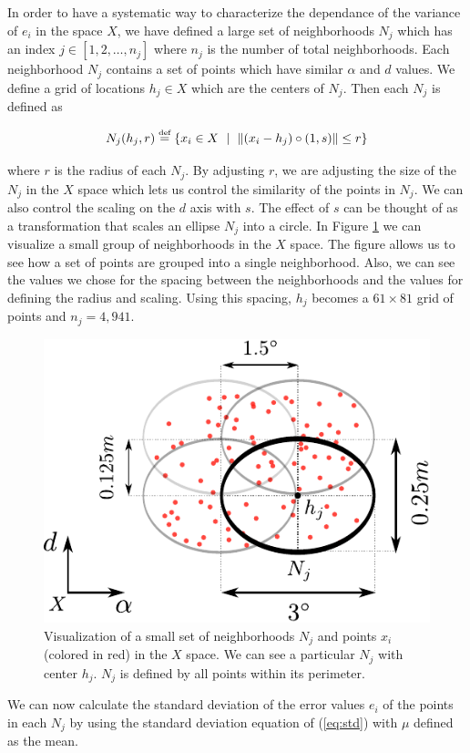 In order to have a systematic way to characterize the dependance of the variance of $e_i$ in the space $X$, we have defined a large set of neighborhoods $N_j$ which has an index $j\in [1,2,\dots,n_j]$ where $n_j$ is the number of total neighborhoods. Each neighborhood $N_j$ contains a set of points which have similar $\alpha$ and $d$ values. We define a grid of locations $h_j \in X$ which are the centers of $N_j$. Then each $N_j$ is defined as

{\setlength\abovedisplayskip{-4pt} \setlength\belowdisplayskip{-2pt} %
\begin{equation}
N_j(h_j,r)  \stackrel{\text{\tiny def}}{=} \{x_i\in X\ \mid \ \|(x_i-h_j)\circ (1,s)\| \leq r\} \\
\end{equation}
}

\noindent where $r$ is the radius of each $N_j$. By adjusting $r$, we are
adjusting the size of the $N_j$ in the $X$ space which lets us control the
similarity of the points in $N_j$. We can also control the scaling on the $d$
axis with $s$. The effect of $s$ can be thought of as a transformation that scales an ellipse $N_j$ into a circle. 
In Figure \ref{fig:spaceCircles} we can visualize a small group of neighborhoods in
the $X$ space. The figure allows us to see how a set of points are grouped
into a single neighborhood. Also, we can see the values we chose for the
spacing between the neighborhoods and the values for defining the radius and scaling. Using this
spacing, $h_j$ becomes a $61\times81 $ grid of points and $n_j=4,941$. 

\begin{figure}[t]
\centering
\includegraphics[width=.3\textwidth]{pdfFigs/spaceCircles.pdf}
\caption{Visualization of a small set of neighborhoods $N_j$ and points $x_i$ (colored in red) in the $X$ space. We can see a particular $N_j$ with center $h_j$. $N_j$ is defined by all points within its perimeter.}
\label{fig:spaceCircles}
\end{figure} 

We can now calculate the standard deviation of the error values $e_i$ of the points in each $N_j$ by using the standard deviation equation of (\ref{eq:std}) with $\mu$ defined as the mean. 

